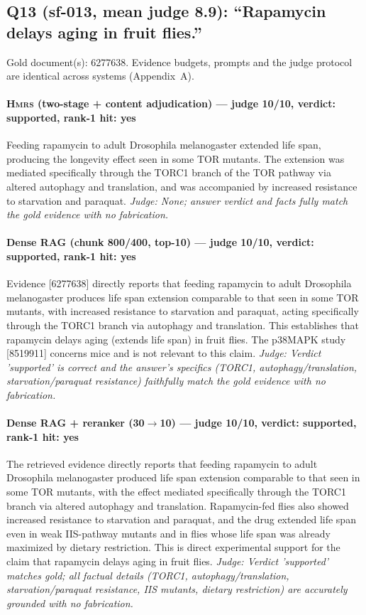 \documentclass[sigconf, review, anonymous]{acmart}
\begin{document}
\subsection{Q13 (sf-013, mean judge 8.9): ``Rapamycin delays aging in fruit flies.''}
\label{app:q13}
\noindent Gold document(s): 6277638. Evidence budgets, prompts and the judge protocol are identical across systems (Appendix~A).
\paragraph{\textbf{\textsc{Hmrs}} (two-stage + content adjudication) --- judge 10/10, verdict: supported, rank-1 hit: yes}
\noindent Feeding rapamycin to adult Drosophila melanogaster extended life span, producing the longevity effect seen in some TOR mutants. The extension was mediated specifically through the TORC1 branch of the TOR pathway via altered autophagy and translation, and was accompanied by increased resistance to starvation and paraquat.
\noindent\small\textit{Judge: None; answer verdict and facts fully match the gold evidence with no fabrication.}
\paragraph{Dense RAG (chunk 800/400, top-10) --- judge 10/10, verdict: supported, rank-1 hit: yes}
\noindent Evidence [6277638] directly reports that feeding rapamycin to adult Drosophila melanogaster produces life span extension comparable to that seen in some TOR mutants, with increased resistance to starvation and paraquat, acting specifically through the TORC1 branch via autophagy and translation. This establishes that rapamycin delays aging (extends life span) in fruit flies. The p38MAPK study [8519911] concerns mice and is not relevant to this claim.
\noindent\small\textit{Judge: Verdict 'supported' is correct and the answer's specifics (TORC1, autophagy/translation, starvation/paraquat resistance) faithfully match the gold evidence with no fabrication.}
\paragraph{Dense RAG + reranker (30$\to$10) --- judge 10/10, verdict: supported, rank-1 hit: yes}
\noindent The retrieved evidence directly reports that feeding rapamycin to adult Drosophila melanogaster produced life span extension comparable to that seen in some TOR mutants, with the effect mediated specifically through the TORC1 branch via altered autophagy and translation. Rapamycin-fed flies also showed increased resistance to starvation and paraquat, and the drug extended life span even in weak IIS-pathway mutants and in flies whose life span was already maximized by dietary restriction. This is direct experimental support for the claim that rapamycin delays aging in fruit flies.
\noindent\small\textit{Judge: Verdict 'supported' matches gold; all factual details (TORC1, autophagy/translation, starvation/paraquat resistance, IIS mutants, dietary restriction) are accurately grounded with no fabrication.}
\end{document}
